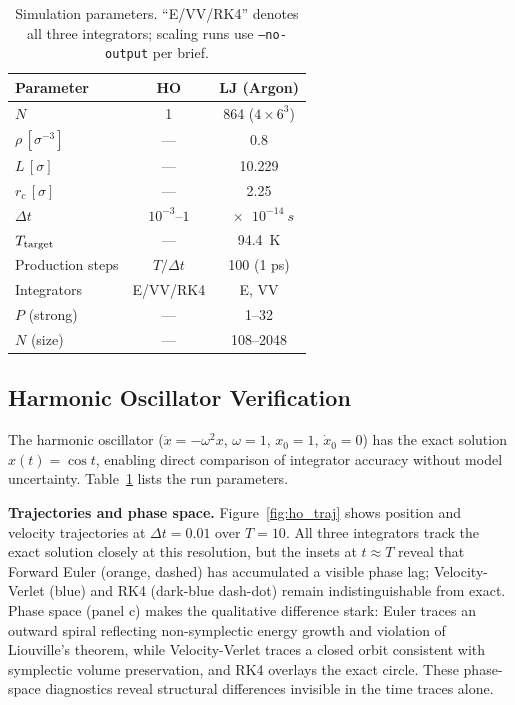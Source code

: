 \documentclass[10pt,twocolumn]{article}
\begin{document}
\begin{table}[t]
  \centering
  \caption{Simulation parameters. ``E/VV/RK4'' denotes all three integrators;
    scaling runs use \texttt{--no-output} per brief.}
  \label{tab:params}
  \small
  \setlength{\tabcolsep}{4pt}
  \begin{tabular}{@{}lcc@{}}
    \toprule
    Parameter & HO & LJ (Argon) \\
    \midrule
    $N$               & 1         & 864 ($4\times6^3$) \\
    $\rho\,[\sigma^{-3}]$ & ---    & 0.8 \\
    $L\,[\sigma]$      & ---       & 10.229 \\
    $r_c\,[\sigma]$    & ---       & 2.25 \\
    $\Delta t$         & $10^{-3}$--$1$ & $\SI{e-14}{s}$ \\
    $T_{\rm target}$   & ---       & \SI{94.4}{K} \\
    Production steps   & $T/\Delta t$ & 100 (1 ps) \\
    Integrators        & E/VV/RK4  & E, VV \\
    $P$ (strong)       & ---       & 1--32 \\
    $N$ (size)         & ---       & 108--2048 \\
    \bottomrule
  \end{tabular}
\end{table}

\subsection{Harmonic Oscillator Verification}
\label{sec:ho}

The harmonic oscillator ($\ddot{x} = -\omega^2 x$, $\omega=1$, $x_0=1$,
$\dot{x}_0=0$) has the exact solution $x(t)=\cos t$, enabling direct
comparison of integrator accuracy without model uncertainty.
Table~\ref{tab:params} lists the run parameters.

\textbf{Trajectories and phase space.}
Figure~\ref{fig:ho_traj} shows position and velocity trajectories at
$\Delta t=0.01$ over $T=10$.
All three integrators track the exact solution closely at this resolution,
but the insets at $t\approx T$ reveal that Forward Euler (orange, dashed)
has accumulated a visible phase lag; Velocity-Verlet (blue) and RK4
(dark-blue dash-dot) remain indistinguishable from exact.
Phase space (panel c) makes the qualitative difference stark: Euler traces
an outward spiral reflecting non-symplectic energy growth and violation of
Liouville's theorem, while Velocity-Verlet traces a closed orbit
consistent with symplectic volume preservation, and RK4 overlays the exact
circle.
These phase-space diagnostics reveal structural differences invisible in the
time traces alone.
\end{document}
